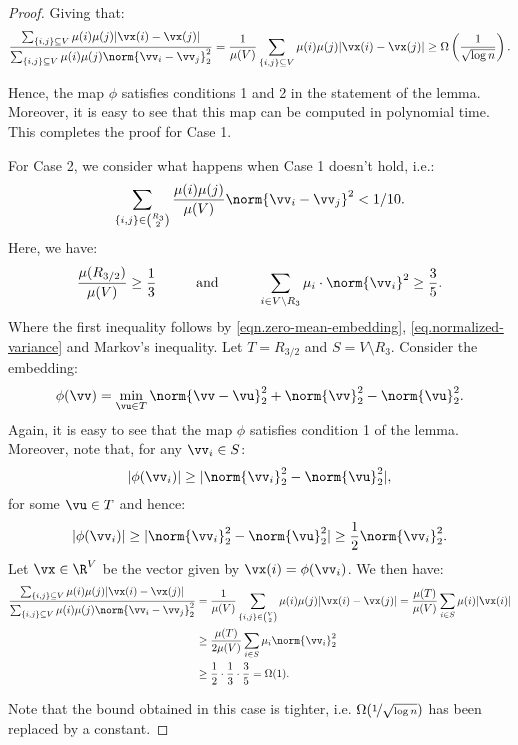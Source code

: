 \documentclass[letterpaper]{article}
\begin{document}
\begin{proof}
    Giving that:
    \[
         {\sum_{\{i,j\}\subseteq V} \mu(i) \mu(j) |\vx(i) - \vx(j)| \over \sum_{\{i,j\}\subseteq V} \mu(i) \mu(j) \norm{\vv_i - \vv_j}^2_2} =  {1  \over \mu(V)}\sum_{\{i,j\}\subseteq V} \mu(i) \mu(j) |\vx(i) - \vx(j)|  \geq \Omega\left({1 \over \sqrt{\log n}}\right).
    \]

    Hence, the map $\phi$ satisfies conditions 1 and 2 in the statement of the lemma. Moreover, it is easy to see that this map can be computed in polynomial time. This completes the proof for Case 1.

    For Case 2, we consider what happens when Case 1 doesn't hold, i.e.:
    \[
        \sum_{\{i,j\}\in \binom{R_3}{2}} {\mu(i) \mu(j)\over \mu(V)} \norm{\vv_i - \vv_j}^2 < 1/10.
    \]
    Here, we have:
    \[
        {\mu(R_{3/2}) \over \mu(V)} \geq {1\over 3}  \hspace{1cm}\text{and}\hspace{1cm}\sum_{i\in V\setminus R_3} \mu_i \cdot \norm{\vv_i}^2 \geq {3\over 5}.
    \]
    Where the first inequality follows by \eqref{eqn.zero-mean-embedding}, \eqref{eq.normalized-variance} and Markov's inequality.
    Let $T = R_{3/2}$ and $S = V\setminus R_{3}$. Consider the embedding:
    \[
        \phi(\vv) = \min_{\vu\in T} \norm{\vv- \vu}^2_2 + \norm{\vv}_2^2 - \norm{\vu}_2^2.
    \]
    Again, it is easy to see that the map $\phi$ satisfies condition 1 of the lemma. Moreover, note that, for any $\vv_i \in S$:
    \[
        |\phi(\vv_i)| \geq |\norm{\vv_i}^2_2 - \norm{\vu}_2^2|,
    \]
    for some $\vu \in T$ and hence:
    \[
        |\phi(\vv_i)| \geq |\norm{\vv_i}^2_2 - \norm{\vu}_2^2| \geq {1\over 2} \norm{\vv_i}^2_2.
    \]
    Let $\vx\in \R^V$ be the vector given by $\vx(i) = \phi(\vv_i)$. We then have:
    \begin{align*}
        {\sum_{\{i,j\}\subseteq V} \mu(i) \mu(j) |\vx(i) - \vx(j)| \over \sum_{\{i,j\}\subseteq V} \mu(i) \mu(j) \norm{\vv_i - \vv_j}^2_2}&= {1\over \mu(V)}\sum_{\{i,j\}\in \binom{V}{2}} {\mu(i) \mu(j)} |\vx(i) -\vx(j)| = {\mu(T)\over \mu(V)} \sum_{i \in S} \mu(i)|\vx(i)| \\
        &\geq {\mu(T) \over 2\mu(V)} \sum_{i \in S} \mu_i\norm{\vv_i}_2^2 \\
        &\geq {1 \over 2}\cdot {1\over 3} \cdot {3 \over 5 } = \Omega(1).    \end{align*}

    Note that the bound obtained in this case is tighter, i.e. $\Omega(\nicefrac{1}{\sqrt{\log n}})$ has been replaced by a constant.
\end{proof}
 
\end{document}
